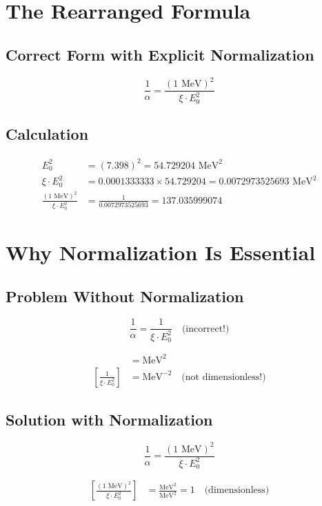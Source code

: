 \documentclass[12pt,a4paper]{article}
\theoremstyle{definition}
\begin{document}
	\section*{The Rearranged Formula}
	
	\subsection*{Correct Form with Explicit Normalization}
	
	\[
	\boxed{\frac{1}{\alpha} = \frac{(1 \text{ MeV})^2}{\xi \cdot E_0^2}}
	\]
	
	\subsection*{Calculation}
	
	\begin{align*}
		E_0^2 &= (7.398)^2 = 54.729204 \text{ MeV}^2 \\
		\xi \cdot E_0^2 &= 0.0001333333 \times 54.729204 = 0.0072973525693 \text{ MeV}^2 \\
		\frac{(1 \text{ MeV})^2}{\xi \cdot E_0^2} &= \frac{1}{0.0072973525693} = 137.035999074
	\end{align*}
	
	\section*{Why Normalization Is Essential}
	
	\subsection*{Problem Without Normalization}
	
	\[
	\frac{1}{\alpha} = \frac{1}{\xi \cdot E_0^2} \quad \text{(incorrect!)}
	\]
	
	\begin{align*}
		[\xi \cdot E_0^2] &= \text{MeV}^2 \\
		\left[\frac{1}{\xi \cdot E_0^2}\right] &= \text{MeV}^{-2} \quad \text{(not dimensionless!)}
	\end{align*}
	
	\subsection*{Solution with Normalization}
	
	\[
	\frac{1}{\alpha} = \frac{(1 \text{ MeV})^2}{\xi \cdot E_0^2}
	\]
	
	\begin{align*}
		\left[\frac{(1 \text{ MeV})^2}{\xi \cdot E_0^2}\right] &= \frac{\text{MeV}^2}{\text{MeV}^2} = 1 \quad \text{(dimensionless)}
	\end{align*}
\end{document}
